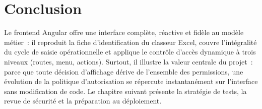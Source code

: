 \section*{Conclusion}
Le frontend Angular offre une interface complète, réactive et fidèle au modèle métier~: il reproduit
la fiche d'identification du classeur Excel, couvre l'intégralité du cycle de saisie opérationnelle
et applique le contrôle d'accès dynamique à trois niveaux (routes, menu, actions). Surtout, il
illustre la valeur centrale du projet~: parce que toute décision d'affichage dérive de l'ensemble des
permissions, une évolution de la politique d'autorisation se répercute instantanément sur l'interface
sans modification de code. Le chapitre suivant présente la stratégie de tests, la revue de sécurité et
la préparation au déploiement.
